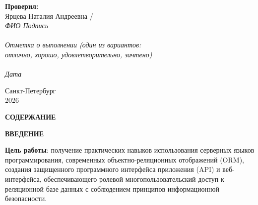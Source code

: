 \documentclass[a4paper,14pt]{article}
\begin{document}
\begin{titlepage}
\begin{flushright}
        \textbf{Проверил:}\\ [0.5em]
        Ярцева Наталия Андреевна / \underline{\hspace{1.5cm}} \\
        {\scriptsize{\textit{ФИО \hspace{2cm} Подпись \hspace{1cm}}}} \\ [1.5cm]

        {\scriptsize \underline{\hspace{4cm}}} \\
        {\scriptsize \textit{Отметка о выполнении (один из вариантов: \\ отлично, хорошо, удовлетворительно, зачтено)}} \\
        {\scriptsize \underline{\hspace{4cm}}} \\
        {\scriptsize \textit{Дата \hspace{1.5cm}}}
    \end{flushright}

    \vfill
    Санкт-Петербург\\
    2026
\end{titlepage}

\newpage
\pagestyle{plain}
\setcounter{page}{2}

\begin{center}
    {\bfseries \MakeUppercase{Содержание}}
\end{center}
\vspace{-0.5cm}
\tableofcontents

\newpage
\begin{center}
    {\bfseries \MakeUppercase{Введение}}
\end{center}

\textbf{Цель работы}: получение практических навыков использования серверных языков программирования, современных объектно-реляционных отображений (ORM), создания защищенного программного интерфейса приложения (API) и веб-интерфейса, обеспечивающего ролевой многопользовательский доступ к реляционной базе данных с соблюдением принципов информационной безопасности.
\end{document}
